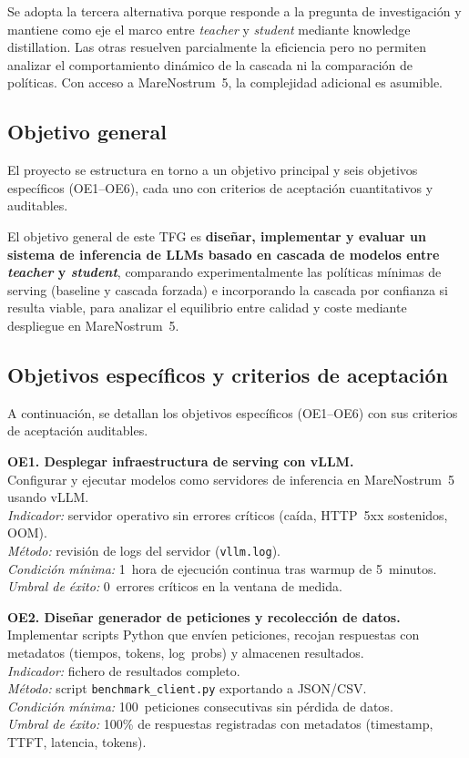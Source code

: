 Se adopta la tercera alternativa porque responde a la pregunta de investigación y mantiene como eje el marco entre \textit{teacher} y \textit{student} mediante knowledge distillation. Las otras resuelven parcialmente la eficiencia pero no permiten analizar el comportamiento dinámico de la cascada ni la comparación de políticas. Con acceso a MareNostrum~5, la complejidad adicional es asumible.

\subsection{Objetivo general}

El proyecto se estructura en torno a un objetivo principal y seis objetivos específicos (OE1--OE6), cada uno con criterios de aceptación cuantitativos y auditables.

El objetivo general de este TFG es \textbf{diseñar, implementar y evaluar un sistema de inferencia de LLMs basado en cascada de modelos entre \textit{teacher} y \textit{student}}, comparando experimentalmente las políticas mínimas de serving (baseline y cascada forzada) e incorporando la cascada por confianza si resulta viable, para analizar el equilibrio entre calidad y coste mediante despliegue en MareNostrum~5.

\subsection{Objetivos específicos y criterios de aceptación}
\label{subsec:oe-especificos}

A continuación, se detallan los objetivos específicos (OE1--OE6) con sus criterios de aceptación auditables.

\textbf{OE1. Desplegar infraestructura de serving con vLLM.}\\
Configurar y ejecutar modelos como servidores de inferencia en MareNostrum~5 usando vLLM.\\
\textit{Indicador:} servidor operativo sin errores críticos (caída, HTTP~5xx sostenidos, OOM).\\
\textit{Método:} revisión de logs del servidor (\texttt{vllm.log}).\\
\textit{Condición mínima:} 1~hora de ejecución continua tras warmup de 5~minutos.\\
\textit{Umbral de éxito:} 0~errores críticos en la ventana de medida.

\textbf{OE2. Diseñar generador de peticiones y recolección de datos.}\\
Implementar scripts Python que envíen peticiones, recojan respuestas con metadatos (tiempos, tokens, log~probs) y almacenen resultados.\\
\textit{Indicador:} fichero de resultados completo.\\
\textit{Método:} script \texttt{benchmark\_client.py} exportando a JSON/CSV.\\
\textit{Condición mínima:} 100~peticiones consecutivas sin pérdida de datos.\\
\textit{Umbral de éxito:} 100\% de respuestas registradas con metadatos (timestamp, TTFT, latencia, tokens).

